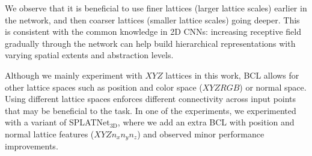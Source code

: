 \documentclass[10pt,twocolumn,letterpaper]{article}
\begin{document}
We observe that it is beneficial to use finer lattices (larger lattice scales) earlier in the network, and then coarser lattices (smaller lattice scales) going deeper. This is consistent with the common knowledge in 2D CNNs: increasing receptive field gradually through the network can help build hierarchical representations with varying spatial extents and abstraction levels. 

Although we mainly experiment with $XYZ$ lattices in this work, BCL allows for other lattice spaces such as position and color space ($XYZRGB$) or normal space. Using different lattice spaces enforces different connectivity across input points that may be beneficial to the task. In one of the experiments, we experimented with a variant of SPLATNet$_{\text{3D}}$, where
we add an extra BCL with position and normal lattice features ($XYZn_xn_yn_z$) and observed minor
performance improvements.
\end{document}
